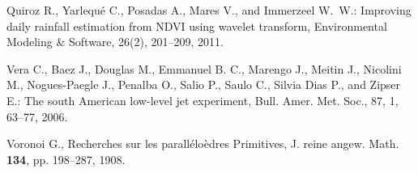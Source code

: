 \documentclass[10pt,letterpaper,conference]{ieeeconf}
\begin{document}
\begin{thebibliography}{999}
 Quiroz R., Yarlequ\'e C., 
Posadas A., Mares V., and Immerzeel W.~W.: Improving daily rainfall 
estimation from NDVI using wavelet transform, Environmental Modeling \& 
Software, 26(2), 201--209, 2011.


 Vera C., Baez J., Douglas M., 
Emmanuel B. C., Marengo J., Meitin J., Nicolini M., Nogues-Paegle J., Penalba 
O., Salio P., Saulo C., Silvia Dias P., and Zipser E.: The south American 
low-level jet experiment, Bull. Amer. Met. Soc., 87, 1, 63--77, 2006. 


 Voronoi G., Recherches sur les parall\'elo\`edres 
Primitives, J. reine angew. Math. {\bf 134}, pp. 198--287, 1908. 



\end{thebibliography}
\end{document}

